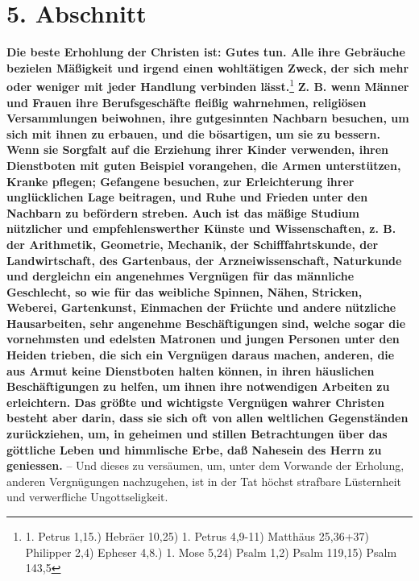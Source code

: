 \section{5. Abschnitt} \label{kap15_ab5}

\label{ref:15_05_freizeitbeschaeftigung}
\textbf{Die beste Erhohlung der Christen ist: Gutes tun. Alle ihre Gebräuche
bezielen
Mäßigkeit und irgend einen wohltätigen Zweck, der sich mehr oder weniger mit
jeder Handlung verbinden lässt.}\footnote{1. Petrus 1,15.) Hebräer 10,25) 1.
Petrus 4,9-11)
Matthäus 25,36+37) Philipper 2,4) Epheser 4,8.) 1. Mose 5,24) Psalm 1,2) Psalm
119,15) Psalm 143,5}
\textbf{Z. B. wenn Männer und Frauen ihre
Berufsgeschäfte fleißig 
wahrnehmen,
religiösen Versammlungen beiwohnen, ihre gutgesinnten Nachbarn
besuchen, um sich
mit ihnen zu erbauen, und die bösartigen, um sie zu bessern. Wenn sie Sorgfalt
auf die Erziehung ihrer Kinder
verwenden, ihren 
Dienstboten mit guten Beispiel
vorangehen, die Armen unterstützen, Kranke pflegen;
Gefangene 
besuchen, zur
Erleichterung ihrer unglücklichen Lage beitragen, und Ruhe und Frieden unter den
Nachbarn zu befördern streben. Auch ist das mäßige
Studium nützlicher und
empfehlenswerther Künste und
Wissenschaften, z. B. 
der Arithmetik,
Geometrie,
Mechanik, der
Schifffahrtskunde, 
der Landwirtschaft, des
Gartenbaus, der
Arzneiwissenschaft, Naturkunde und dergleichn ein
angenehmes Vergnügen für 
das männliche Geschlecht, so wie für das weibliche 
Spinnen, Nähen, Stricken,
Weberei, Gartenkunst, Einmachen der Früchte und andere nützliche
Hausarbeiten,
sehr angenehme Beschäftigungen sind, welche sogar die vornehmsten und edelsten
Matronen und jungen Personen unter den Heiden trieben, die sich ein Vergnügen
daraus machen, anderen, die aus Armut keine Dienstboten halten können, in ihren
häuslichen Beschäftigungen zu helfen, um ihnen ihre notwendigen Arbeiten zu
erleichtern. Das größte und wichtigste Vergnügen wahrer Christen besteht aber
darin, dass sie sich oft von allen weltlichen Gegenständen zurückziehen, um, in
geheimen und stillen Betrachtungen über das 
göttliche Leben und himmlische Erbe,
daß Nahesein des Herrn zu geniessen.} -- Und dieses zu versäumen, um, unter dem
Vorwande der Erholung, anderen Vergnügungen nachzugehen, ist in der Tat höchst
strafbare Lüsternheit und verwerfliche Ungottseligkeit.


